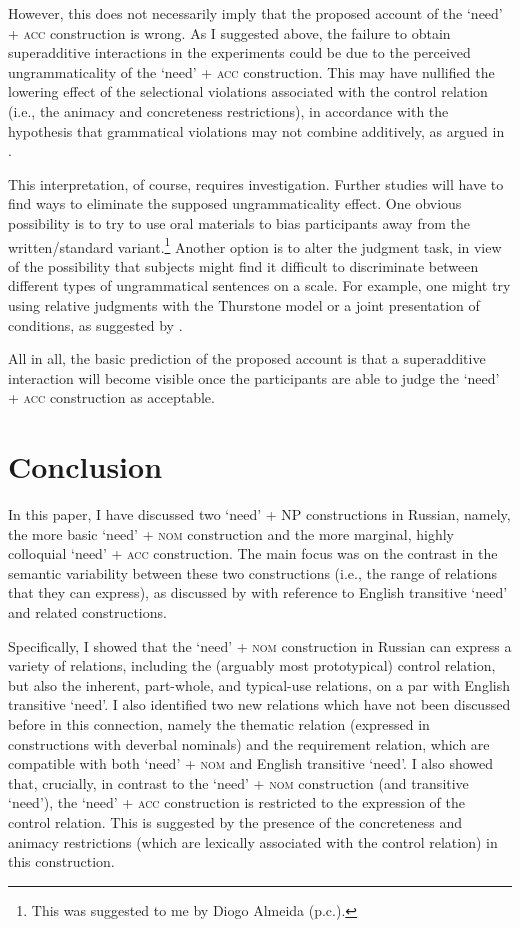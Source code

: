 \documentclass[output=paper,colorlinks,citecolor=brown]{langscibook}
\begin{document}
However, this does not necessarily imply that the proposed account of the `need' + \textsc{acc} construction is wrong. As I suggested above, the failure to obtain superadditive interactions in the experiments could be due to the perceived ungrammaticality of the `need' + \textsc{acc} construction. This may have nullified the lowering effect of the selectional violations associated with the control relation (i.e., the animacy and concreteness restrictions), in accordance with the hypothesis that grammatical violations may not combine additively, as argued in \citet{Hofmeister.Casasanto.Staum.Sag2014}.

This interpretation, of course, requires investigation. Further studies will have to find ways to eliminate the supposed ungrammaticality effect. One obvious possibility is to try to use oral materials to bias participants away from the written/standard variant.\footnote{This was suggested to me by Diogo Almeida (p.c.).} Another option is to alter the judgment task, in view of the possibility that subjects might find it difficult to discriminate between different types of ungrammatical sentences on a scale. For example, one might try using relative judgments with the Thurstone model \citep[see][]{Langsford.etal2018} or a joint presentation of conditions, as suggested by \citet{Marty.Chemla.Sprouse2020}.

All in all, the basic prediction of the proposed account is that a superadditive interaction will become visible once the participants are able to judge the `need' + \textsc{acc} construction as acceptable.

\section{Conclusion\label{section-conclusion}}

In this paper, I have discussed two `need' + NP constructions in Russian, namely, the more basic `need' + \textsc{nom} construction and the more marginal, highly colloquial `need' + \textsc{acc} construction. The main focus was on the contrast in the semantic variability between these two constructions (i.e., the range of relations that they can express), as discussed by \citet{Zaroukian.Beller2013} with reference to English transitive `need' and related constructions.

Specifically, I showed that the `need' + \textsc{nom} construction in Russian
can express a variety of relations, including the (arguably most prototypical) control relation, but also the inherent, part-whole, and typical-use relations, on a par with English transitive `need'. I also identified two new relations which have not been discussed before in this connection, namely the thematic relation (expressed in constructions with deverbal nominals) and the requirement relation, which are compatible with both `need' + \textsc{nom} and English transitive `need'. I also showed that, crucially, in contrast to the `need' + \textsc{nom} construction (and transitive `need'), the `need' + \textsc{acc} construction is restricted to the expression of the control relation. This is suggested by the presence of the concreteness and animacy restrictions (which are lexically associated with the control relation) in this construction.
\end{document}

